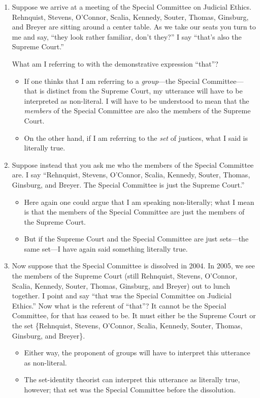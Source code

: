 \documentclass[11pt]{article}
\begin{document}
\begin{spacing}{1.5}
\begin{enumerate}
  \item Suppose we arrive at a meeting of the Special Committee on
    Judicial Ethics.  Rehnquist, Stevens, O'Connor, Scalia, Kennedy,
    Souter, Thomas, Ginsburg, and Breyer are sitting around a center
    table.  As we take our seats you turn to me and say, ``they look
    rather familiar, don't they?''  I say ``that's also the Supreme
    Court.''

    What am I referring to with the demonstrative expression ``that''?
    \begin{itemize}
      \item If one thinks that I am referring to a {\em group}---the
        Special Committee---that is distinct from the Supreme Court,
        my utterance will have to be interpreted as non-literal.  I
        will have to be understood to mean that the {\em members} of
        the Special Committee are also the members of the Supreme
        Court.
      \item On the other hand, if I am referring to the {\em set}
        of justices, what I said is literally true.
     \end{itemize}

  \item Suppose instead that you ask me who the members of the Special
    Committee are.  I say ``Rehnquist, Stevens, O'Connor, Scalia,
    Kennedy, Souter, Thomas, Ginsburg, and Breyer.  The Special
    Committee is just the Supreme Court.''  
    \begin{itemize}
      \item Here again one could argue that I am speaking
        non-literally; what I mean is that the members of the Special
        Committee are just the members of the Supreme Court.  
      \item But if the Supreme Court and the Special Committee are
        just sets---the same set---I have again said something
        literally true.
    \end{itemize}

  \item Now suppose that the Special Committee is dissolved in 2004.
    In 2005, we see the members of the Supreme Court (still Rehnquist,
    Stevens, O'Connor, Scalia, Kennedy, Souter, Thomas, Ginsburg, and
    Breyer) out to lunch together.  I point and say ``that was the
    Special Committee on Judicial Ethics.''  Now what is the referent
    of ``that''?  It cannot be the Special Committee, for that has
    ceased to be.  It must either be the Supreme Court or the set
    \{Rehnquist, Stevens, O'Connor, Scalia, Kennedy, Souter, Thomas,
    Ginsburg, and Breyer\}.  
    \begin{itemize}
      \item Either way, the proponent of groups will
    have to interpret this utterance as non-literal.  
      \item The set-identity theorist can interpret this utterance as
        literally true, however; that set was the Special Committee
        before the dissolution.
    \end{itemize}


\end{enumerate}
\end{spacing}
\end{document}
